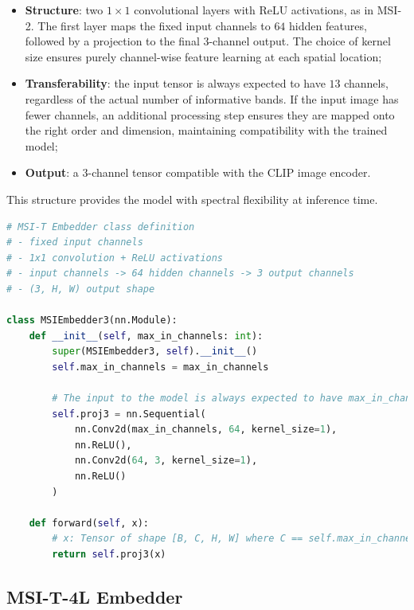 \documentclass[a4paper, twoside, english]{sapthesis} %
\begin{document}
\begin{itemize}
    \item \textbf{Structure}: two $1\times1$ convolutional layers with ReLU activations, as in MSI-2. The first layer maps the fixed input channels to $64$ hidden features, followed by a projection to the final 3-channel output. The choice of kernel size ensures purely channel-wise feature learning at each spatial location;
    \item \textbf{Transferability}: the input tensor is always expected to have $13$ channels, regardless of the actual number of informative bands. If the input image has fewer channels, an additional processing step ensures they are mapped onto the right order and dimension, maintaining compatibility with the trained model;
    \item \textbf{Output}: a $3$-channel tensor compatible with the CLIP image encoder.
\end{itemize}

This structure provides the model with spectral flexibility at inference time.

\vspace{0.5cm}

\begin{lstlisting}[language=Python, caption={MSI-T Embedder implemented in PyTorch.},  label={lst:msi_t}]
# MSI-T Embedder class definition
# - fixed input channels
# - 1x1 convolution + ReLU activations
# - input channels -> 64 hidden channels -> 3 output channels
# - (3, H, W) output shape

class MSIEmbedder3(nn.Module):
    def __init__(self, max_in_channels: int):
        super(MSIEmbedder3, self).__init__()
        self.max_in_channels = max_in_channels

        # The input to the model is always expected to have max_in_channels -> the forward is different
        self.proj3 = nn.Sequential(
            nn.Conv2d(max_in_channels, 64, kernel_size=1),
            nn.ReLU(),
            nn.Conv2d(64, 3, kernel_size=1),
            nn.ReLU()
        )

    def forward(self, x):
        # x: Tensor of shape [B, C, H, W] where C == self.max_in_channels
        return self.proj3(x)
\end{lstlisting}


\subsection{MSI-T-4L Embedder}\label{sec:msi_t_4l}
\end{document}
